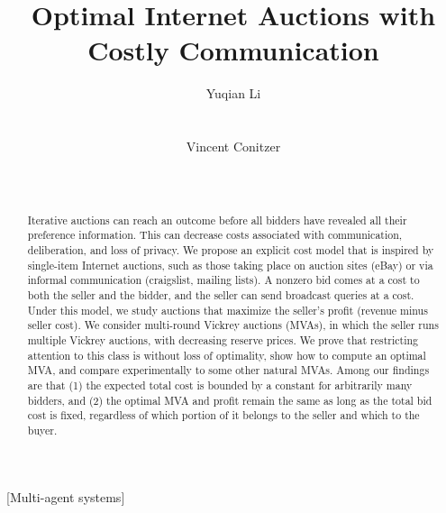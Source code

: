\documentclass{aamas2013}
\begin{document}
\title{Optimal Internet Auctions with Costly Communication}


\author{ 
\alignauthor
Yuqian Li\\
	\\
	\\
\alignauthor
Vincent Conitzer\\
	\\
	\\
}


\maketitle

\begin{abstract}
Iterative auctions can reach an outcome before all bidders have 
revealed all their preference information.  This can decrease costs
associated with communication, deliberation, and loss of privacy.
We propose an explicit cost model that is inspired by single-item
Internet auctions, such as those taking place on auction sites (eBay)
or via informal communication (craigslist, mailing lists). 
A nonzero bid comes at a cost to both the seller and the bidder, and
the seller can send broadcast queries at a cost.
Under this model, we study auctions that maximize the seller's profit 
(revenue minus seller cost).
We consider multi-round Vickrey auctions (MVAs), in which the seller
runs multiple Vickrey auctions, with decreasing reserve prices.
We prove that restricting attention to this class is without loss of
optimality, show how to compute an optimal MVA, and compare
experimentally to some other natural MVAs.
Among our findings are that (1) the expected total cost is bounded
by a constant for arbitrarily many bidders, and (2) the optimal MVA
and profit remain
the same as long as the total bid cost is fixed, regardless of which
portion of it belongs to the seller and which to the buyer.
\end{abstract}

[Multi-agent systems]

\end{document}
